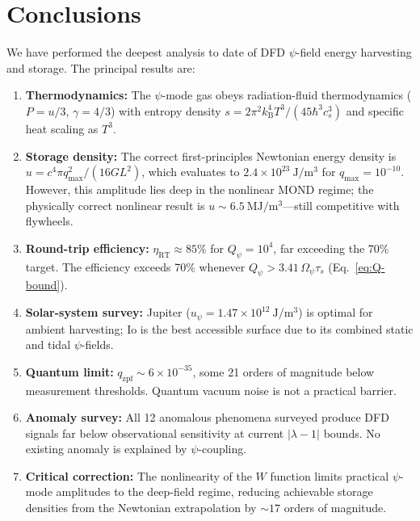 \documentclass[aps,prd,twocolumn,showpacs,preprintnumbers,superscriptaddress,nofootinbib]{revtex4-2}
\newcommand{\Wfunc}{W}
\newcommand{\kB}{k_{\mathrm{B}}}
\newcommand{\Qpsi}{Q_\psi}
\newcommand{\Opsi}{\Omega_\psi}
\begin{document}
\section{Conclusions}\label{sec:conclusions}

We have performed the deepest analysis to date of DFD $\psi$-field
energy harvesting and storage.  The principal results are:

\begin{enumerate}
\item \textbf{Thermodynamics:} The $\psi$-mode gas obeys radiation-fluid
thermodynamics ($P = u/3$, $\gamma = 4/3$) with entropy density
$s = 2\pi^2\kB^4 T^3/(45\hbar^3 c_s^3)$ and specific heat scaling
as $T^3$.

\item \textbf{Storage density:} The correct first-principles Newtonian
energy density is $u = c^4\pi q_{\max}^2/(16GL^2)$, which evaluates
to $2.4\times 10^{23}~\mathrm{J/m^3}$ for $q_{\max} = 10^{-10}$.
However, this amplitude lies deep in the nonlinear MOND regime; the
physically correct nonlinear result is
$u \sim 6.5~\mathrm{MJ/m^3}$---still competitive with flywheels.

\item \textbf{Round-trip efficiency:}
$\eta_{\mathrm{RT}} \approx 85\%$ for $\Qpsi = 10^4$, far exceeding
the 70\% target.  The efficiency exceeds 70\% whenever
$\Qpsi > 3.41\,\Opsi\tau_s$ (Eq.~\ref{eq:Q-bound}).

\item \textbf{Solar-system survey:} Jupiter ($u_\psi = 1.47\times 10^{12}~\mathrm{J/m^3}$)
is optimal for ambient harvesting; Io is the best accessible surface due
to its combined static and tidal $\psi$-fields.

\item \textbf{Quantum limit:} $q_{\mathrm{zpf}} \sim 6\times 10^{-35}$,
some 21 orders of magnitude below measurement thresholds.  Quantum
vacuum noise is not a practical barrier.

\item \textbf{Anomaly survey:} All 12 anomalous phenomena surveyed
produce DFD signals far below observational sensitivity at current
$|\lambda-1|$ bounds.  No existing anomaly is explained by
$\psi$-coupling.

\item \textbf{Critical correction:} The nonlinearity of the
$\Wfunc$ function limits practical $\psi$-mode amplitudes to the
deep-field regime, reducing achievable storage densities from the
Newtonian extrapolation by $\sim 17$ orders of magnitude.
\end{enumerate}
\end{document}
